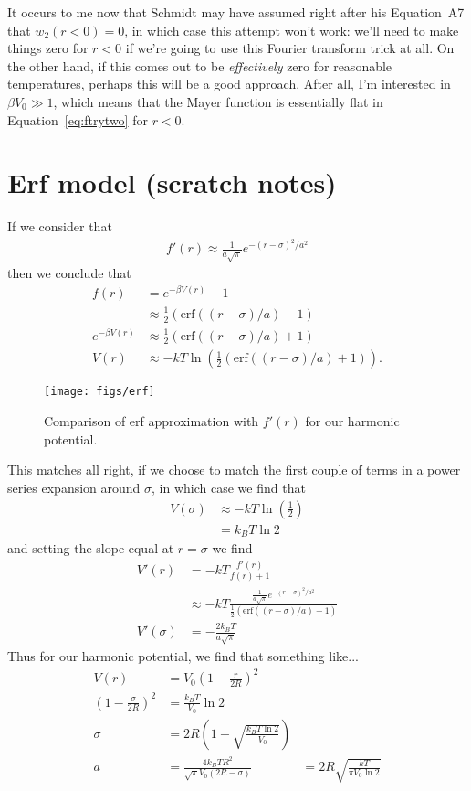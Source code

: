 \documentclass[letterpaper,twocolumn,amsmath,amssymb,prb]{revtex4-1}
\begin{document}
It occurs to me now that Schmidt may have assumed right after his
Equation~A7 that $w_2(r<0)=0$, in which case this attempt won't work:
we'll need to make things zero for $r<0$ if we're going to use this
Fourier transform trick at all.  On the other hand, if this comes out
to be \emph{effectively} zero for reasonable temperatures, perhaps
this will be a good approach.  After all, I'm interested in $\beta V_0
\gg 1$, which means that the Mayer function is essentially flat in
Equation~\ref{eq:ftrytwo} for $r<0$.

\section{Erf model (scratch notes)}
If we consider that
\begin{align}
  f'(r) \approx \frac{1}{a\sqrt{\pi}} e^{-(r-\sigma)^2/a^2}
\end{align}
then we conclude that
\begin{align}
  f(r) &= e^{-\beta V(r)} - 1 \\
  &\approx \tfrac12 ( \mathrm{erf}((r-\sigma)/a) - 1 ) \\
  e^{-\beta V(r)} &\approx \tfrac12 ( \mathrm{erf}((r-\sigma)/a) + 1 ) \\
  V(r) &\approx -kT\ln\left(\tfrac12 ( \mathrm{erf}((r-\sigma)/a) + 1 )\right).
\end{align}
\begin{figure}
  \texttt{[image: figs/erf]}
  \caption{Comparison of erf approximation with $f'(r)$ for our
    harmonic potential.}
\end{figure}
This matches all right, if we choose to match the first couple of
terms in a power series expansion around $\sigma$, in which case we
find that
\begin{align}
  V(\sigma) &\approx -kT\ln\left(\tfrac12\right) \\
  &= k_BT \ln 2
\end{align}
and setting the slope equal at $r=\sigma$ we find
\begin{align}
  V'(r) &= -kT \frac{f'(r)}{f(r)+1} \\
  &\approx -kT \frac{\frac{1}{a\sqrt{\pi}} e^{-(r-\sigma)^2/a^2}}{\tfrac12 ( \mathrm{erf}((r-\sigma)/a) + 1 )}
  \\
  V'(\sigma) &= -\frac{2k_BT}{a\sqrt{\pi}}
\end{align}
Thus for our harmonic potential, we find that something like...
\begin{align}
  V(r) &= V_0 \left(1-\frac{r}{2R}\right)^2\\
  \left(1 - \frac{\sigma}{2R}\right)^2 &= \frac{k_BT}{V_0}\ln 2 \\
  \sigma &= 2R\left( 1 - \sqrt{\frac{k_BT \ln 2}{V_0}}\right) \\
  a &= \frac{4k_BTR^2}{\sqrt{\pi}V_0(2R-\sigma)}
  &= 2R\sqrt{\frac{kT}{\pi V_0 \ln 2}}
\end{align}
\end{document}
